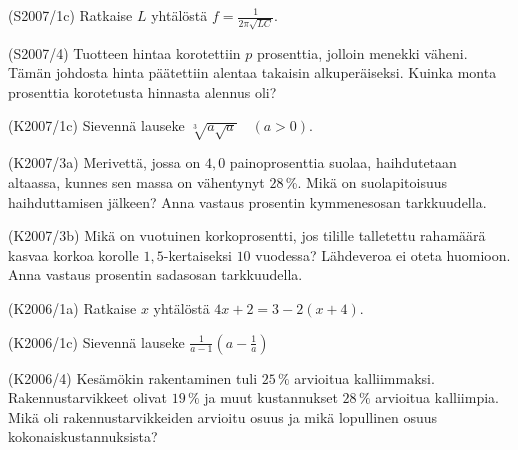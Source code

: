 \begin{tehtava}(S2007/1c) Ratkaise $L$ yhtälöstä $f=\frac{1}{2\pi\sqrt{LC}}$.
\end{tehtava}

\begin{tehtava}(S2007/4) Tuotteen hintaa korotettiin $p$ prosenttia, jolloin menekki väheni. Tämän johdosta hinta päätettiin alentaa takaisin alkuperäiseksi. Kuinka monta prosenttia korotetusta hinnasta alennus oli?
\end{tehtava}

\begin{tehtava}(K2007/1c) Sievennä lauseke $ \sqrt[3]{a \sqrt{a}} \quad (a > 0) $.
\end{tehtava}

\begin{tehtava}(K2007/3a) Merivettä, jossa on $4,0$ painoprosenttia suolaa, haihdutetaan altaassa, kunnes sen massa on vähentynyt $28$\,\%. Mikä on suolapitoisuus haihduttamisen jälkeen? Anna vastaus prosentin kymmenesosan tarkkuudella. 
\end{tehtava}

\begin{tehtava}(K2007/3b) Mikä on vuotuinen korkoprosentti, jos tilille talletettu rahamäärä kasvaa korkoa korolle $1,5$-kertaiseksi $10$ vuodessa? Lähdeveroa ei oteta huomioon. Anna vastaus prosentin sadasosan tarkkuudella.
\end{tehtava}


\begin{tehtava}(K2006/1a) Ratkaise $x$ yhtälöstä $4x + 2 =  3 - 2(x + 4)$.
\end{tehtava}

\begin{tehtava}(K2006/1c) Sievennä lauseke 
                        $ \frac{1}{a - 1} \left( a - \frac{1}{a} \right) $
\end{tehtava}

\begin{tehtava}(K2006/4) Kesämökin rakentaminen tuli $25\,\%$ arvioitua kalliimmaksi. Rakennustarvikkeet olivat $19\,\%$ ja muut kustannukset $28\,\% $ arvioitua kalliimpia. Mikä oli rakennustarvikkeiden arvioitu osuus ja mikä lopullinen osuus kokonaiskustannuksista?
\end{tehtava}

